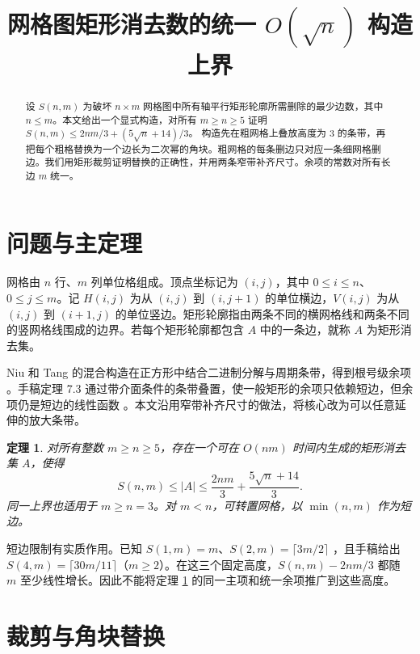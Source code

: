\documentclass[UTF8,11pt,a4paper,fontset=none]{ctexart}
\title{\texorpdfstring{网格图矩形消去数的统一 \(O(\sqrt n)\) 构造上界}{网格图矩形消去数的统一根号级构造上界}}
\author{}
\date{}
\theoremstyle{plain}
\newtheorem{theorem}{定理}
\theoremstyle{definition}
\begin{document}
\maketitle
\vspace{-1.5em}

\begin{abstract}
设 \(S(n,m)\) 为破坏 \(n\times m\) 网格图中所有轴平行矩形轮廓所需删除的最少边数，其中 \(n\le m\)。本文给出一个显式构造，对所有 \(m\ge n\ge5\) 证明
\(
S(n,m)\le 2nm/3+(5\sqrt n+14)/3
\)。
构造先在粗网格上叠放高度为 \(3\) 的条带，再把每个粗格替换为一个边长为二次幂的角块。粗网格的每条删边只对应一条细网格删边。我们用矩形裁剪证明替换的正确性，并用两条窄带补齐尺寸。余项的常数对所有长边 \(m\) 统一。
\end{abstract}

\section{问题与主定理}

网格由 \(n\) 行、\(m\) 列单位格组成。顶点坐标记为 \((i,j)\)，其中 \(0\le i\le n\)、\(0\le j\le m\)。记 \(H(i,j)\) 为从 \((i,j)\) 到 \((i,j+1)\) 的单位横边，\(V(i,j)\) 为从 \((i,j)\) 到 \((i+1,j)\) 的单位竖边。矩形轮廓指由两条不同的横网格线和两条不同的竖网格线围成的边界。若每个矩形轮廓都包含 \(A\) 中的一条边，就称 \(A\) 为矩形消去集。

Niu 和 Tang 的混合构造在正方形中结合二进制分解与周期条带，得到根号级余项 \cite{niuconf,niujournal}。手稿定理 7.3 通过带介面条件的条带叠置，使一般矩形的余项只依赖短边，但余项仍是短边的线性函数 \cite{manuscript}。本文沿用窄带补齐尺寸的做法，将核心改为可以任意延伸的放大条带。

\begin{theorem}\label{thm:main}
对所有整数 \(m\ge n\ge5\)，存在一个可在 \(O(nm)\) 时间内生成的矩形消去集 \(A\)，使得
\begin{equation}\label{eq:main}
  S(n,m)\le |A|\le \frac{2nm}{3}+\frac{5\sqrt n+14}{3}.
\end{equation}
同一上界也适用于 \(m\ge n=3\)。对 \(m<n\)，可转置网格，以 \(\min(n,m)\) 作为短边。
\end{theorem}

短边限制有实质作用。已知 \(S(1,m)=m\)、\(S(2,m)=\lceil3m/2\rceil\) \cite{niujournal}，且手稿给出 \(S(4,m)=\lceil30m/11\rceil\)（\(m\ge2\)）\cite{manuscript}。在这三个固定高度，\(S(n,m)-2nm/3\) 都随 \(m\) 至少线性增长。因此不能将定理 \ref{thm:main} 的同一主项和统一余项推广到这些高度。

\section{裁剪与角块替换}
\end{document}
